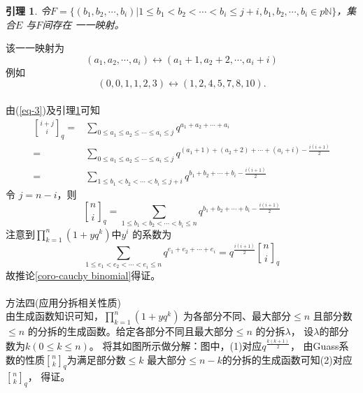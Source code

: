 \documentclass[a4paper,12pt]{ctexart}
\newtheorem{lem}{引理}[section]
\def\pf{\noindent {\bf 证明\ }}
\begin{document}
\begin{lem}
	\label{lem-1}
	令$F=\{(b_1,b_2,\cdots,b_i)|1 \leq  b_1 < b_2 <\cdots < b_i \leq j+i, b_1,b_2,\cdots,b_i \in p\mathbb{N} \}$，集合$E$ 与$F$间存在
	一一映射。
\end{lem}

\pf
该一一映射为
\begin{equation*}
	(a_1,a_2,\cdots,a_i)\longleftrightarrow (a_1+1,a_2+2,\cdots,a_i+i)
\end{equation*}
例如
\begin{equation*}
	(0,0,1,1,2,3)\longleftrightarrow (1,2,4,5,7,8,10).
\end{equation*}
~\\
由(\ref{eq-3})及引理\ref{lem-1}可知
\begin{align*}
	{{i+j} \brack i}_q=&\sum_{0 \leq a_1 \leq a_2 \leq\cdots \leq a_i\leq j} q^{a_1+a_2+\cdots+a_i}\\
	=&\sum_{0 \leq a_1 \leq a_2 \leq\cdots \leq a_i\leq j} q^{(a_1+1)+(a_2+2)+\cdots+(a_i+i)-\frac{i(i+1)}{2}}\\
	=&\sum_{1 \leq  b_1 < b_2 <\cdots < b_i \leq j+i} q^{b_1+b_2+\cdots+b_i-\frac{i(i+1)}{2}}
\end{align*}
令 $j=n-i$，则
\begin{equation}
	\label{eq-4}
	{n \brack i}_q=\sum_{1 \leq  b_1 < b_2 <\cdots < b_i \leq n} q^{b_1+b_2+\cdots+b_i-\frac{i(i+1)}{2}}
\end{equation}
注意到$\prod_{k=1}^{n}(1+yq^k)$中$y^i$ 的系数为
\begin{equation*}
	\sum_{1 \leq e_1 < e_2 <\cdots <e_i\leq n} q^{e_1+e_2+\cdots+e_i}=q^{\frac{i(i+1)}{2}} {n \brack i}_q
\end{equation*}
故推论\ref{coro-cauchy binomial}得证。\\
~\\
方法四(应用分拆相关性质)\\
由生成函数知识可知，$\prod_{k=1}^{n}(1+yq^k)$ 为各部分不同、最大部分$\leq n$ 且部分数$\leq n$ 的分拆的生成函数。给定各部分不同且最大部分$\leq n$ 的分拆$\lambda$，
设$\lambda$的部分数为$k(0 \leq k \leq n)$。 将其如图所示做分解：图中，(1)对应$q^{\frac{k(k+1)}{2}}$，
由Guass系数的性质${n \brack k}_q$为满足部分数$\leq k$ 最大部分$\leq n-k$的分拆的生成函数可知(2)对应 ${n \brack k}_q$，
得证。\\
\end{document}
